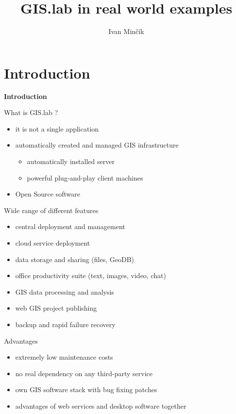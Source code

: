 \documentclass[12pt]{beamer}
\author{Ivan Minčík}
\title{GIS.lab in real world examples}
\begin{document}
\begin{frame}
	\titlepage
\end{frame}


\section{Introduction}
\begin{frame}
	\begin{center}
		\LARGE\textbf{Introduction}	
	\end{center}
\end{frame}


\begin{frame}{What is GIS.lab ?}
	\begin{itemize}[<+->]
		\item it is not a single application
		\item automatically created and managed GIS infrastructure
			\begin{itemize}[<+->]
				\item automatically installed server
				\item powerful plug-and-play client machines
			\end{itemize}
		\item Open Source software
	\end{itemize}
\end{frame}


\begin{frame}{Wide range of different features}
	\begin{itemize}[<+->]
		\item central deployment and management
		\item cloud service deployment
		\item data storage and sharing (files, GeoDB)
		\item office productivity suite (text, images, video, chat)
		\item GIS data processing and analysis
		\item web GIS project publishing
		\item backup and rapid failure recovery
	\end{itemize}
\end{frame}


\begin{frame}{Advantages}
	\begin{itemize}[<+->]
		\item extremely low maintenance costs
		\item no real dependency on any third-party service
		\item own GIS software stack with bug fixing patches
		\item advantages of web services and desktop software together
	\end{itemize}
\end{frame}
\end{document}
